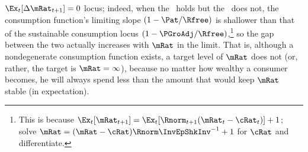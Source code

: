 \documentclass[BufferStockTheory]{subfiles}
\begin{document}
$\Ex_{t}[\Delta \mRat_{t+1}]=0$ locus; indeed, when the \RIC~holds but
the \GIC~does not, the consumption function's limiting slope
$(1-\Pat/\Rfree)$ is shallower than that of the sustainable consumption
locus $(1-\PGroAdj/\Rfree)$,\footnote{This is because
  $\Ex_{t}[\mRat_{t+1}]=\Ex_{t}[\Rnorm_{t+1}(\mRat_{t}-\cRat_{t})]+1$; solve $\mRat = (\mRat - \cRat)\Rnorm \InvEpShkInv^{-1}+1$ for $\cRat$ and differentiate.}
so the gap between the two actually increases with $\mRat$ in the
limit.  That is, although a nondegenerate consumption function
exists, a target level of $\mRat$ does not (or, rather, the
target is $\mRat=\infty$), because no matter how wealthy a consumer
becomes, he will always spend less than the amount that
would keep $\mRat$ stable (in expectation).

\renewcommand{\figFile}{FVACnotGIC}
\hypertarget{\figFile}{}


\begin{comment}
  The foregoing has some connection with the theoretical results in
  Szeidl~\citeyearpar{szeidlInvariant}, who shows that the condition we
  call the \GIC~guarantees that $\mRat$ will have an asymptotically
  bounded mean.  He also shows that under these circumstances $\mRat$
  satisfies conditions he proves to be necessary for the existence of a
  stable invariant distribution.  Furthermore, $\aRat$, $\bRat$, and $\cRat$
  are also shown to have stable invariant distributions and asymptotically
  bounded means.  We make use of these results below.
\end{comment}

\begin{comment} %
  A final point worth reemphasizing is that neither the Return
  Impatience Condition nor the Finite Human Wealth Condition was
  required for the contraction mapping proof.  Both these conditions are
  necessary for a nondegenerate solution to exist in the unconstrained
  perfect foresight case.  This is noteworthy because in some models and
  in many economists' intuition, the introduction of uncertainty reduces
  the space of parameter values for which a unique solution exists;
  here, precisely the opposite occurs.  Indeed, many of the
  parameterizations newly eligible for solution are quite plausible, so
  this observation is not merely a curiosum but of real practical
  value.\footnote{An easy example of a case where the perfect foresight
    model has no solution is where $\Rfree >1$, $\DiscFac = 1/\Rfree$
    and $\PGro > \Rfree$.}
\end{comment}
\end{document}
